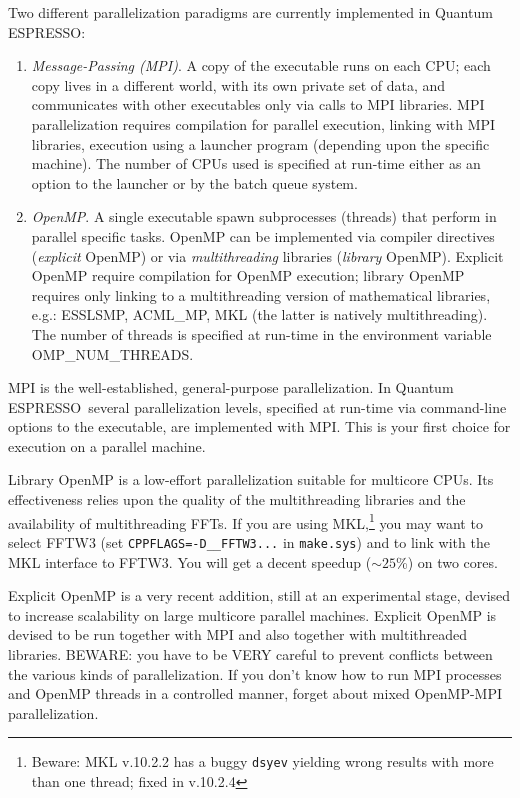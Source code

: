 \documentclass[12pt,a4paper]{article}
\def\qe{{\sc Quantum ESPRESSO}}
\begin{document}
Two different parallelization paradigms are currently implemented 
in \qe:
\begin{enumerate}
\item {\em Message-Passing (MPI)}. A copy of the executable runs 
on each CPU; each copy lives in a different world, with its own
private set of data, and communicates with other executables only
via calls to MPI libraries. MPI parallelization requires compilation 
for parallel execution, linking with MPI libraries, execution using 
a launcher program (depending upon the specific machine). The number of CPUs used
is specified at run-time either as an option to the launcher or
by the batch queue system. 
\item {\em OpenMP}.  A single executable spawn subprocesses
(threads) that perform in parallel specific tasks. 
OpenMP can be implemented via compiler directives ({\em explicit} 
OpenMP) or via {\em multithreading} libraries  ({\em library} OpenMP).
Explicit OpenMP require compilation for OpenMP execution;
library OpenMP requires only linking to a multithreading
version of mathematical libraries, e.g.:
ESSLSMP, ACML\_MP, MKL (the latter is natively multithreading).
The number of threads is specified at run-time in the environment 
variable OMP\_NUM\_THREADS. 
\end{enumerate}

MPI is the well-established, general-purpose parallelization.
In \qe\ several parallelization levels, specified at run-time
via command-line options to the executable, are implemented
with MPI. This is your first choice for execution on a parallel 
machine.

Library OpenMP is a low-effort parallelization suitable for
multicore CPUs. Its effectiveness relies upon the quality of 
the multithreading libraries and the availability of 
multithreading FFTs. If you are using MKL,\footnote{Beware: 
MKL v.10.2.2 has a buggy \texttt{dsyev} yielding wrong results 
with more than one thread; fixed in v.10.2.4}
you may want to select FFTW3 (set \texttt{CPPFLAGS=-D\_\_FFTW3...}
in \texttt{make.sys}) and to link with the MKL interface to FFTW3. 
You will get a decent speedup ($\sim 25$\%) on two cores.

Explicit OpenMP is a very recent addition, still at an 
experimental stage, devised to increase scalability on
large multicore parallel machines. Explicit OpenMP is 
devised to be run together with MPI and also together 
with multithreaded libraries. BEWARE: you have to be VERY 
careful to prevent conflicts between the various kinds of
parallelization. If you don't know how to run MPI processes
and OpenMP threads in a controlled manner, forget about mixed 
OpenMP-MPI parallelization.
\end{document}
